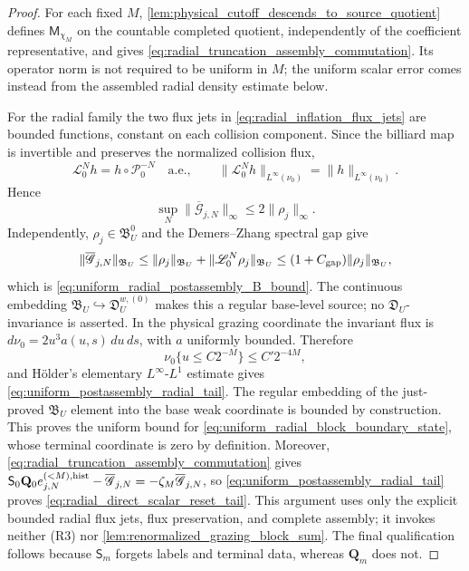 \documentclass[11pt]{amsart}
\theoremstyle{compactplain}
\theoremstyle{compactdefinition}
\theoremstyle{compactremark}
\newcommand{\Ltransfer}{\mathscr L}
\newcommand{\Pcal}{\mathcal P}
\begin{document}
\begin{proof}
For each fixed \(M\),
\cref{lem:physical_cutoff_descends_to_source_quotient} defines
\(\mathsf M_{\chi_M}\) on the countable completed quotient, independently of
the coefficient representative, and gives
\eqref{eq:radial_truncation_assembly_commutation}.  Its operator norm is not
required to be uniform in \(M\); the uniform scalar error comes instead from
the assembled radial density estimate below.

For the radial family the two flux jets in
\eqref{eq:radial_inflation_flux_jets} are bounded functions, constant on each
collision component.  Since the billiard map is invertible and preserves the
normalized collision flux,
\[
 \Ltransfer_0^Nh= h\circ\Pcal_0^{-N}\quad\text{a.e.},
 \qquad
 \|\Ltransfer_0^Nh\|_{L^\infty(\nu_0)}=\|h\|_{L^\infty(\nu_0)}.
\]
Hence
\[
 \sup_N\|\overline{\mathscr G}_{j,N}\|_\infty
 \le2\|\rho_j\|_\infty.
\]
Independently, \(\rho_j\in\mathfrak B_U^0\) and the Demers--Zhang spectral
gap give
\[
 \|\overline{\mathscr G}_{j,N}\|_{\mathfrak B_U}
 \le \|\rho_j\|_{\mathfrak B_U}
     +\|\Ltransfer_0^N\rho_j\|_{\mathfrak B_U}
 \le (1+C_{\rm gap})\|\rho_j\|_{\mathfrak B_U},
\]
which is \eqref{eq:uniform_radial_postassembly_B_bound}.  The continuous
embedding \(\mathfrak B_U\hookrightarrow\mathfrak D_U^{w,(0)}\) makes this a
regular base-level source; no \(\mathfrak D_U\)-invariance is asserted.
In the physical grazing coordinate the invariant flux is
\(d\nu_0=2u^3a(u,s)\,du\,ds\), with \(a\) uniformly bounded.  Therefore
\[
 \nu_0\{u\le C2^{-M}\}\le C'2^{-4M},
\]
and Hölder's elementary \(L^\infty\)-\(L^1\) estimate gives
\eqref{eq:uniform_postassembly_radial_tail}.  The regular embedding of the
just-proved \(\mathfrak B_U\) element into the base weak coordinate is bounded
by construction.  This proves the uniform
bound for \eqref{eq:uniform_radial_block_boundary_state}, whose terminal
coordinate is zero by definition.  Moreover,
\eqref{eq:radial_truncation_assembly_commutation} gives
\(\mathsf S_0\mathbf Q_0e_{j,N}^{(<M),\rm hist}
-\overline{\mathscr G}_{j,N}=-\zeta_M\overline{\mathscr G}_{j,N}\),
so \eqref{eq:uniform_postassembly_radial_tail} proves
\eqref{eq:radial_direct_scalar_reset_tail}.  This argument uses only the
explicit bounded radial flux jets, flux preservation, and complete assembly;
it invokes neither (R3) nor
\cref{lem:renormalized_grazing_block_sum}.  The final qualification follows because
\(\mathsf S_m\) forgets labels and terminal data, whereas
\(\mathbf Q_m\) does not.
\end{proof}
\end{document}
